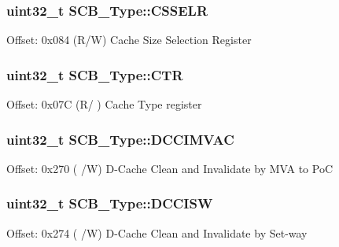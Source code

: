 \subsubsection[{\texorpdfstring{C\+S\+S\+E\+LR}{CSSELR}}]{ uint32\+\_\+t S\+C\+B\+\_\+\+Type\+::\+C\+S\+S\+E\+LR}\hypertarget{struct_s_c_b___type_afdc87bd02624a24c3bef7f56511c5444}{}\label{struct_s_c_b___type_afdc87bd02624a24c3bef7f56511c5444}
Offset\+: 0x084 (R/W) Cache Size Selection Register 
\subsubsection[{\texorpdfstring{C\+TR}{CTR}}]{ uint32\+\_\+t S\+C\+B\+\_\+\+Type\+::\+C\+TR}\hypertarget{struct_s_c_b___type_ab207e64e1e857ea1b68895172264bd8d}{}\label{struct_s_c_b___type_ab207e64e1e857ea1b68895172264bd8d}
Offset\+: 0x07C (R/ ) Cache Type register 
\subsubsection[{\texorpdfstring{D\+C\+C\+I\+M\+V\+AC}{DCCIMVAC}}]{ uint32\+\_\+t S\+C\+B\+\_\+\+Type\+::\+D\+C\+C\+I\+M\+V\+AC}\hypertarget{struct_s_c_b___type_a29db2ff9cf75c787ea350468fc224408}{}\label{struct_s_c_b___type_a29db2ff9cf75c787ea350468fc224408}
Offset\+: 0x270 ( /W) D-\/\+Cache Clean and Invalidate by M\+VA to PoC 
\subsubsection[{\texorpdfstring{D\+C\+C\+I\+SW}{DCCISW}}]{ uint32\+\_\+t S\+C\+B\+\_\+\+Type\+::\+D\+C\+C\+I\+SW}\hypertarget{struct_s_c_b___type_a16e05cc18ec7ab501620bf7263f226e7}{}\label{struct_s_c_b___type_a16e05cc18ec7ab501620bf7263f226e7}
Offset\+: 0x274 ( /W) D-\/\+Cache Clean and Invalidate by Set-\/way 
